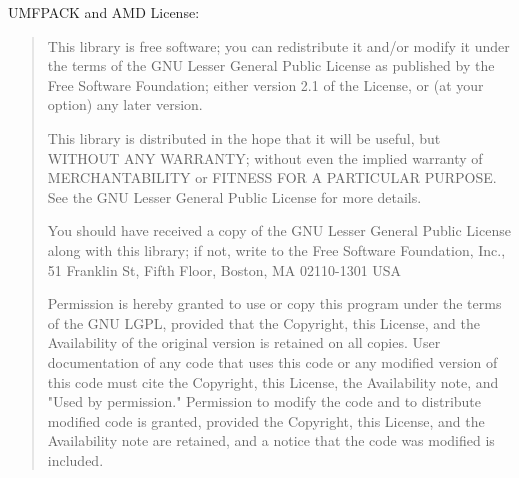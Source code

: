 \documentclass[10pt,a4paper]{ddedoc}
\begin{document}
UMFPACK and AMD License:
\begin{quote}
    This library is free software; you can redistribute it and/or
    modify it under the terms of the GNU Lesser General Public
    License as published by the Free Software Foundation; either
    version 2.1 of the License, or (at your option) any later version.

    This library is distributed in the hope that it will be useful,
    but WITHOUT ANY WARRANTY; without even the implied warranty of
    MERCHANTABILITY or FITNESS FOR A PARTICULAR PURPOSE.  See the GNU
    Lesser General Public License for more details.

    You should have received a copy of the GNU Lesser General Public
    License along with this library; if not, write to the Free Software
    Foundation, Inc., 51 Franklin St, Fifth Floor, Boston, MA  02110-1301
    USA

    Permission is hereby granted to use or copy this program under the
    terms of the GNU LGPL, provided that the Copyright, this License,
    and the Availability of the original version is retained on all copies.
    User documentation of any code that uses this code or any modified
    version of this code must cite the Copyright, this License, the
    Availability note, and "Used by permission." Permission to modify
    the code and to distribute modified code is granted, provided the
    Copyright, this License, and the Availability note are retained,
    and a notice that the code was modified is included.
\end{quote}


 \label{sec:bibliography}
\end{document}
